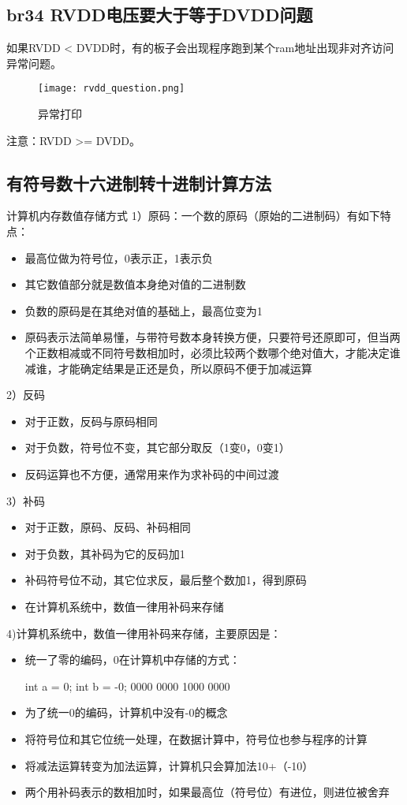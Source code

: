 \subsection{br34 RVDD电压要大于等于DVDD问题}
如果RVDD < DVDD时，有的板子会出现程序跑到某个ram地址出现非对齐访问异常问题。
\begin{figure}[H]
\centering
\texttt{[image: rvdd\_question.png]}
\caption{异常打印}
\label{fig:rvdd_exeception}
\end{figure}
注意：RVDD >= DVDD。


\subsection{有符号数十六进制转十进制计算方法}
计算机内存数值存储方式
1）原码：一个数的原码（原始的二进制码）有如下特点：
\begin{itemize}
\item 最高位做为符号位，0表示正，1表示负
\item 其它数值部分就是数值本身绝对值的二进制数
\item 负数的原码是在其绝对值的基础上，最高位变为1
\item 原码表示法简单易懂，与带符号数本身转换方便，只要符号还原即可，但当两个正数相减或不同符号数相加时，必须比较两个数哪个绝对值大，才能决定谁减谁，才能确定结果是正还是负，所以原码不便于加减运算
\end{itemize}

2）反码
\begin{itemize}
\item 对于正数，反码与原码相同
\item 对于负数，符号位不变，其它部分取反（1变0，0变1）
\item 反码运算也不方便，通常用来作为求补码的中间过渡
\end{itemize}

3）补码
\begin{itemize}
\item 对于正数，原码、反码、补码相同
\item 对于负数，其补码为它的反码加1
\item 补码符号位不动，其它位求反，最后整个数加1，得到原码
\item 在计算机系统中，数值一律用补码来存储
\end{itemize}

4)计算机系统中，数值一律用补码来存储，主要原因是：
\begin{itemize}
\item 统一了零的编码，0在计算机中存储的方式：
\begin{myccode}[caption=zero 编码]
        int a = 0; int b = -0;
        0000 0000     1000 0000
\end{myccode}
\item 为了统一0的编码，计算机中没有-0的概念
\item 将符号位和其它位统一处理，在数据计算中，符号位也参与程序的计算
\item 将减法运算转变为加法运算，计算机只会算加法10+（-10）
\item 两个用补码表示的数相加时，如果最高位（符号位）有进位，则进位被舍弃
\end{itemize}

